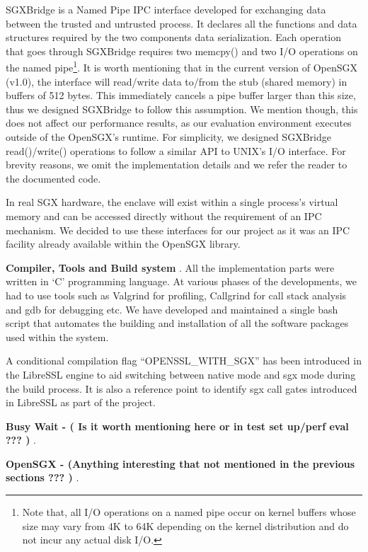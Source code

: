\documentclass[../main.tex]{subfiles}
\begin{document}
SGXBridge is a Named Pipe IPC interface developed for exchanging data between
the trusted and untrusted process. It declares all the functions and data
structures required by the two components data serialization. Each operation
that goes through SGXBridge requires two memcpy() and two I/O operations on the
named pipe\footnote{Note that, all I/O operations on a named pipe occur on
kernel buffers whose size may vary from 4K to 64K depending on the kernel
distribution and do not incur any actual disk I/O.}. It is worth mentioning
that in the current version of OpenSGX (v1.0), the interface will read/write
data to/from the stub (shared memory) in buffers of 512 bytes. This immediately
cancels a pipe buffer larger than this size, thus we designed SGXBridge to
follow this assumption. We mention though, this does not affect our performance
results, as our evaluation environment executes outside of the OpenSGX's
runtime. For simplicity, we designed SGXBridge read()/write() operations to
follow a similar API to UNIX's I/O interface. For brevity reasons, we omit the
implementation details and we refer the reader to the documented code.

In real SGX hardware, the enclave will exist within a single process's virtual
memory and can be accessed directly without the requirement of an IPC
mechanism. We decided to use these interfaces for our project as it was an IPC
facility already available within the OpenSGX library.

\textbf{Compiler, Tools and Build system }.
All the implementation parts were written in ‘C’ programming language. 
At various phases of the developments, we had to use tools such as Valgrind for profiling, Callgrind for call stack analysis and gdb for debugging etc. We have developed and maintained a single bash script that automates the building and installation of  all the software packages used within the system. 

A conditional compilation flag “OPENSSL\_WITH\_SGX” has been introduced in the LibreSSL engine to aid switching between native mode and sgx mode during the build process. It is also a reference point to identify sgx call gates introduced in LibreSSL as part of the project.

\textbf{ Busy Wait - ( Is it worth mentioning here or in test set up/perf eval ??? ) }.

\textbf{ OpenSGX - (Anything interesting that not mentioned in the previous sections ??? ) }.
\end{document}
